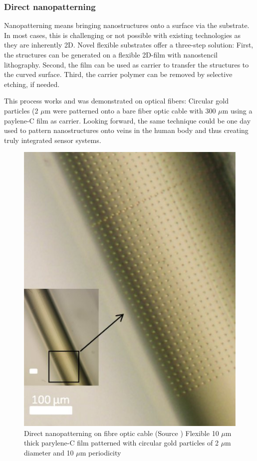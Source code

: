 \documentclass[journal, a4paper]{IEEEtran}
\begin{document}
\subsubsection{Direct nanopatterning}
Nanopatterning means bringing nanostructures onto a surface via the substrate. In most cases, this is challenging or not possible with existing technologies as they are inherently 2D. Novel flexible substrates offer a three-step solution: First, the structures can be generated on a flexible 2D-film with nanostencil lithography. Second, the film can be used as carrier to transfer the structures to the curved surface. Third, the carrier polymer can be removed by selective etching, if needed.

This process works and was demonstrated on optical fibers: Circular gold particles (2 $\mu$m were patterned onto a bare fiber optic cable with 300 $\mu$m using a paylene-C film as carrier. Looking forward, the same technique could be one day used to pattern nanostructures onto veins in the human body and thus creating truly integrated sensor systems. 

\begin{figure}[hbt!]
\begin{center}
\includegraphics[width=0.8\columnwidth]{15patterning.jpg}
\caption{Direct nanopatterning on fibre optic cable (Source \cite{paper}) Flexible 10 $\mu$m thick parylene-C film patterned with circular gold particles of 2 $\mu$m diameter and 10 $\mu$m periodicity}
\label{fig:patterning}
\end{center}
\end{figure} 
\end{document}

